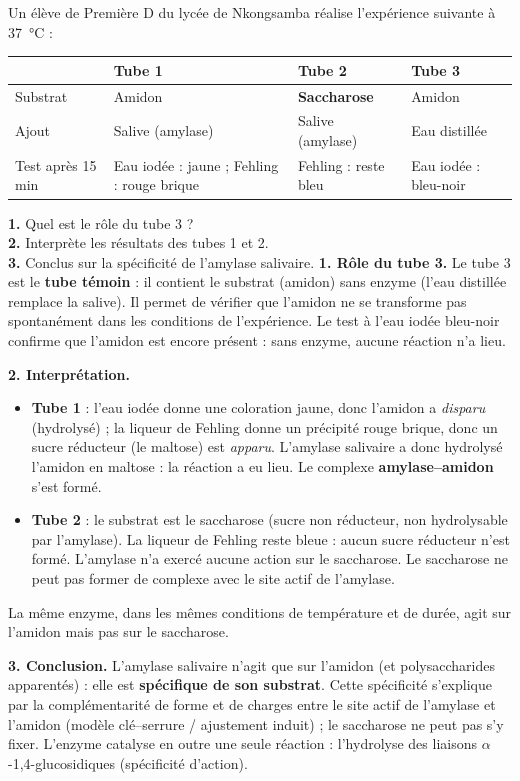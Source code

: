 \documentclass[11pt]{article}
\begin{document}
\begin{exoresolu}
Un élève de Première D du lycée de Nkongsamba réalise l'expérience suivante à \SI{37}{\celsius} :

\begin{center}
\begin{tabularx}{\linewidth}{|l|X|X|X|}\hline
\rowcolor{popblueL}
 & Tube 1 & Tube 2 & Tube 3 \\ \hline
Substrat & Amidon & \textbf{Saccharose} & Amidon \\ \hline
Ajout & Salive (amylase) & Salive (amylase) & Eau distillée \\ \hline
Test après 15 min & Eau iodée : jaune ; Fehling : rouge brique & Fehling : reste bleu & Eau iodée : bleu-noir \\ \hline
\end{tabularx}
\end{center}

\textbf{1.} Quel est le rôle du tube 3 ?\\
\textbf{2.} Interprète les résultats des tubes 1 et 2.\\
\textbf{3.} Conclus sur la spécificité de l'amylase salivaire.
\tcblower
\textbf{1. Rôle du tube 3.} Le tube 3 est le \textbf{tube témoin} : il contient le substrat (amidon) sans enzyme (l'eau distillée remplace la salive). Il permet de vérifier que l'amidon ne se transforme pas spontanément dans les conditions de l'expérience. Le test à l'eau iodée bleu-noir confirme que l'amidon est encore présent : sans enzyme, aucune réaction n'a lieu.

\textbf{2. Interprétation.}
\begin{itemize}
\item \textbf{Tube 1} : l'eau iodée donne une coloration jaune, donc l'amidon a \emph{disparu} (hydrolysé) ; la liqueur de Fehling donne un précipité rouge brique, donc un sucre réducteur (le maltose) est \emph{apparu}. L'amylase salivaire a donc hydrolysé l'amidon en maltose : la réaction a eu lieu. Le complexe \textbf{amylase--amidon} s'est formé.
\item \textbf{Tube 2} : le substrat est le saccharose (sucre non réducteur, non hydrolysable par l'amylase). La liqueur de Fehling reste bleue : aucun sucre réducteur n'est formé. L'amylase n'a exercé aucune action sur le saccharose. Le saccharose ne peut pas former de complexe avec le site actif de l'amylase.
\end{itemize}
La même enzyme, dans les mêmes conditions de température et de durée, agit sur l'amidon mais pas sur le saccharose.

\textbf{3. Conclusion.} L'amylase salivaire n'agit que sur l'amidon (et polysaccharides apparentés) : elle est \textbf{spécifique de son substrat}. Cette spécificité s'explique par la complémentarité de forme et de charges entre le site actif de l'amylase et l'amidon (modèle clé--serrure / ajustement induit) ; le saccharose ne peut pas s'y fixer. L'enzyme catalyse en outre une seule réaction : l'hydrolyse des liaisons $\alpha$-1,4-glucosidiques (spécificité d'action).
\end{exoresolu}
\end{document}
